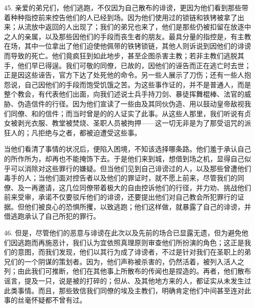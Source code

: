 45. 亲爱的弟兄们，他们逃跑，不仅因为自己散布的诽谤，更因为他们看到那些带着种种指控前来控告他们的人已经到场。因为他们使用过的锁链和铁铐被拿了出来；从流放中返回的人出现了；我们的弟兄也来了，他们是那些仍被扣留在放逐中之人的亲属，以及那些因他们的手段而丧生者的朋友。最具分量的指控是，有主教在场，其中一位拿出了他们迫使他佩带的铁铐锁链，其他人则诉说到因他们的诽谤而导致的死亡。他们竟疯狂到如此地步，甚至企图杀害主教；若非主教们逃脱其手，他们早已得逞。我们可敬的同僚，已故的，因他们的诬告而正在逃亡时去世；正是因这些诬告，官方下达了处死他的命令。另一些人展示了刀伤；还有一些人抱怨说，自己因他们的手段而饱受饥饿之苦。为这些事作证的，并不是普通人，而是整个教会，有代表他们出面，向我们述说士兵手持刀剑、暴徒挥舞棍棒、法官的威胁、伪造信件的行径。因为他们宣读了一些由及其同伙伪造、用以鼓动皇帝敌视我们同僚、和的信件；而当时曾是的的人证实了此事。从这些人那里，我们听说有贞女被剥光衣服、教堂被焚烧、圣职人员被拘押——这一切无非是为了那受诅咒的派狂人的；凡拒绝与之者，都被迫遭受这些事。\par

当他们看清了事情的状况后，便陷入困境，不知该选择哪条路。他们羞于承认自己的所作所为，却再也不能掩饰下去。于是他们来到城，想借到场之机，显得自己似乎可以消除对这些罪行的嫌疑。但当他们见到自己诽谤过的人，以及那些曾遭他们毒手的人；当他们面对控告者以及他们的罪证时，就不愿上前来，尽管我们的同僚、及一再邀请，这几位同僚带着极大的自由控诉他们的行径，并力劝、挑战他们前来受审，承诺不仅要驳斥他们的诽谤，还要提出他们对自己教会所犯罪行的证据。但他们被良心的恐惧所攫，以致逃跑；他们这样做，就暴露了自己的诽谤，并借逃跑承认了自己所犯的罪行。\par

46. 但是，尽管他们的恶意与诽谤在此次以及先前的场合已显露无遗，但为避免他们因逃跑而再施恶计，我们认为宜依照真理原则审查他们所扮演的角色；这正是我们的意图，而我们发现，他们以其行为成了诽谤者，不过是针对我们在圣职上的弟兄们的一个阴谋的策划者。因为，他们声称被杀害的，仍然活着，被列入活人之列；由此我们可推断，他们在其他事上所散布的传闻也是捏造的。再者，他们散布谣言，提及一只，说是被的打碎的；但从、及其他地方来的人，都证实从未发生过此类事情。而且，那些致信我们同僚的埃及主教们，明确肯定他们中间甚至连对此事的丝毫怀疑都不曾有过。\par

